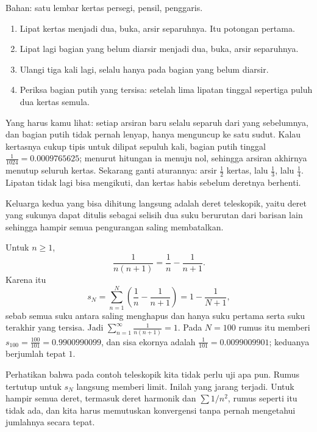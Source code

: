 \begin{tangan}
Bahan: satu lembar kertas persegi, pensil, penggaris.

\begin{enumerate}
\item Lipat kertas menjadi dua, buka, arsir separuhnya. Itu potongan pertama.
\item Lipat lagi bagian yang belum diarsir menjadi dua, buka, arsir separuhnya.
\item Ulangi tiga kali lagi, selalu hanya pada bagian yang belum diarsir.
\item Periksa bagian putih yang tersisa: setelah lima lipatan tinggal sepertiga puluh
      dua kertas semula.
\end{enumerate}

Yang harus kamu lihat: setiap arsiran baru selalu separuh dari yang sebelumnya, dan
bagian putih tidak pernah lenyap, hanya menguncup ke satu sudut. Kalau kertasnya cukup
tipis untuk dilipat sepuluh kali, bagian putih tinggal $\tfrac{1}{1024} = 0.0009765625$;
menurut hitungan ia menuju nol, sehingga arsiran akhirnya menutup seluruh kertas.
Sekarang ganti aturannya: arsir $\tfrac12$ kertas, lalu $\tfrac13$, lalu $\tfrac14$.
Lipatan tidak lagi bisa mengikuti, dan kertas habis sebelum deretnya berhenti.
\end{tangan}

Keluarga kedua yang bisa dihitung langsung adalah deret teleskopik, yaitu deret yang
sukunya dapat ditulis sebagai selisih dua suku berurutan dari barisan lain sehingga
hampir semua pengurangan saling membatalkan.

\begin{contoh}
Untuk $n \ge 1$,
\[
  \frac{1}{n(n+1)} = \frac{1}{n} - \frac{1}{n+1}.
\]
Karena itu
\[
  s_N = \sum_{n=1}^{N} \left(\frac{1}{n} - \frac{1}{n+1}\right)
      = 1 - \frac{1}{N+1},
\]
sebab semua suku antara saling menghapus dan hanya suku pertama serta suku terakhir
yang tersisa. Jadi $\sum_{n=1}^{\infty} \frac{1}{n(n+1)} = 1$. Pada $N=100$ rumus itu
memberi $s_{100} = \tfrac{100}{101} = 0.9900990099$, dan sisa ekornya adalah
$\tfrac{1}{101} = 0.0099009901$; keduanya berjumlah tepat $1$.
\end{contoh}

Perhatikan bahwa pada contoh teleskopik kita tidak perlu uji apa pun. Rumus tertutup
untuk $s_N$ langsung memberi limit. Inilah yang jarang terjadi. Untuk hampir semua
deret, termasuk deret harmonik dan $\sum 1/n^2$, rumus seperti itu tidak ada, dan kita
harus memutuskan konvergensi tanpa pernah mengetahui jumlahnya secara tepat.

